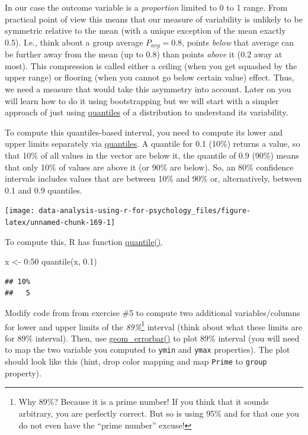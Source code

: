 \documentclass[
]{book}
\newenvironment{Shaded}{\begin{snugshade}}{\end{snugshade}}
\newcommand{\DecValTok}[1]{\textcolor[rgb]{0.00,0.00,0.81}{#1}}
\newcommand{\FloatTok}[1]{\textcolor[rgb]{0.00,0.00,0.81}{#1}}
\newcommand{\FunctionTok}[1]{\textcolor[rgb]{0.00,0.00,0.00}{#1}}
\newcommand{\NormalTok}[1]{#1}
\newcommand{\OtherTok}[1]{\textcolor[rgb]{0.56,0.35,0.01}{#1}}
\newcommand{\SpecialCharTok}[1]{\textcolor[rgb]{0.00,0.00,0.00}{#1}}
\begin{document}
In our case the outcome variable is a \emph{proportion} limited to 0 to 1 range. From practical point of view this means that our measure of variability is unlikely to be symmetric relative to the mean (with a unique exception of the mean exactly 0.5). I.e., think about a group average \(P_{avg} = 0.8\), points \emph{below} that average can be further away from the mean (up to 0.8) than points \emph{above} it (0.2 away at most). This compression is called either a ceiling (when you get squashed by the upper range) or flooring (when you cannot go below certain value) effect. Thus, we need a measure that would take this asymmetry into account. Later on you will learn how to do it using bootstrapping but we will start with a simpler approach of just using \href{https://en.wikipedia.org/wiki/Quantile}{quantiles} of a distribution to understand its variability.

To compute this quantiles-based interval, you need to compute its lower and upper limits separately via \href{https://en.wikipedia.org/wiki/Quantile}{quantiles}. A quantile for 0.1 (10\%) returns a value, so that 10\% of all values in the vector are below it, the quantile of 0.9 (90\%) means that only 10\% of values are above it (or 90\% are below). So, an 80\% confidence intervals includes values that are between 10\% and 90\% or, alternatively, between 0.1 and 0.9 quantiles.

\begin{center}\texttt{[image: data-analysis-using-r-for-psychology\_files/figure-latex/unnamed-chunk-169-1]} \end{center}

To compute this, R has function \href{https://stat.ethz.ch/R-manual/R-devel/library/stats/html/quantile.html}{quantile()}.

\begin{Shaded}
\begin{Highlighting}[]
\NormalTok{x }\OtherTok{\textless{}{-}} \DecValTok{0}\SpecialCharTok{:}\DecValTok{50}
\FunctionTok{quantile}\NormalTok{(x, }\FloatTok{0.1}\NormalTok{)}
\end{Highlighting}
\end{Shaded}

\begin{verbatim}
## 10% 
##   5
\end{verbatim}

Modify code from from exercise \#5 to compute two additional variables/columns for lower and upper limits of the \emph{89\%}\footnote{Why 89\%? Because it is a prime number! If you think that it sounds arbitrary, you are perfectly correct. But so is using 95\% and for that one you do not even have the ``prime number'' excuse!} interval (think about what these limits are for 89\% interval). Then, use \href{https://ggplot2.tidyverse.org/reference/geom_linerange.html}{geom\_errorbar()} to plot 89\% interval (you will need to map the two variable you computed to \texttt{ymin} and \texttt{ymax} properties). The plot should look like this (hint, drop color mapping and map \texttt{Prime} to \texttt{group} property).
\end{document}
